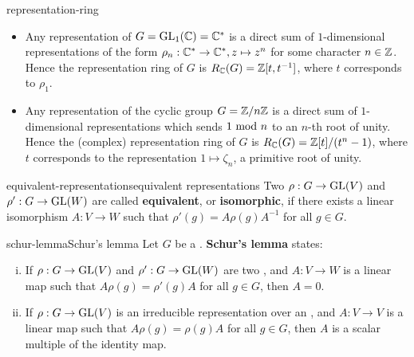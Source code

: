 \begin{example}{representation-ring}
    \begin{itemize}
        \item Any representation of $G = \textup{GL}_1(\mathbb{C}) = \mathbb{C}^*$ is a direct sum of $1$-dimensional representations of the form $\rho_n : \mathbb{C}^* \to \mathbb{C}^*, z \mapsto z^n$ for some character $n \in \mathbb{Z}$. Hence the representation ring of $G$ is $R_{\mathbb{C}}(G) = \mathbb{Z}[t, t^{-1}]$, where $t$ corresponds to $\rho_1$.
        
        \item Any representation of the cyclic group $G = \mathbb{Z}/n\mathbb{Z}$ is a direct sum of $1$-dimensional representations which sends $1 \textup{ mod } n$ to an $n$-th root of unity. Hence the (complex) representation ring of $G$ is $R_{\mathbb{C}}(G) = \mathbb{Z}[t]/(t^n - 1)$, where $t$ corresponds to the representation $1 \mapsto \zeta_n$, a primitive root of unity.
    \end{itemize}
\end{example}

\begin{topic}{equivalent-representations}{equivalent representations}
    Two  $\rho : G \to \textup{GL}(V)$ and $\rho' : G \to \textup{GL}(W)$ are called \textbf{equivalent}, or \textbf{isomorphic}, if there exists a linear isomorphism $A : V \to W$ such that $\rho'(g) = A \rho(g) A^{-1}$ for all $g \in G$.
\end{topic}

\begin{topic}{schur-lemma}{Schur's lemma}
    Let $G$ be a . \textbf{Schur's lemma} states:
    \begin{enumerate}[(i)]
        \item If $\rho : G \to \textup{GL}(V)$ and $\rho' : G \to \textup{GL}(W)$ are two   , and $A : V \to W$ is a linear map such that $A \rho(g) = \rho'(g) A$ for all $g \in G$, then $A = 0$.
        \item If $\rho : G \to \textup{GL}(V)$ is an irreducible representation over an , and $A : V \to V$ is a linear map such that $A \rho(g) = \rho(g) A$ for all $g \in G$, then $A$ is a scalar multiple of the identity map.
    \end{enumerate}
\end{topic}

